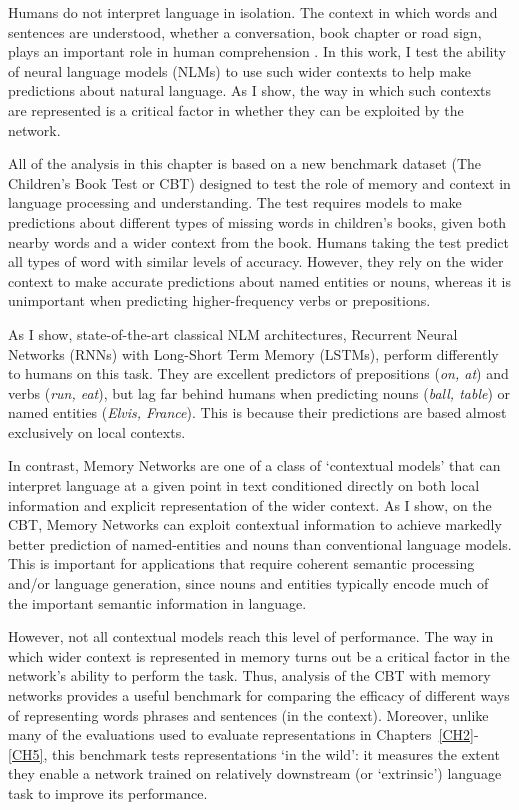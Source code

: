 Humans do not interpret language in isolation. The context in which words and sentences are understood, whether a conversation, book chapter or road sign, plays an important role in human comprehension \citep{altmann1988interaction,binder2011neurobiology}. In this work, I test the ability of neural language models (NLMs) to use such wider contexts to help make predictions about natural language. As I show, the way in which such contexts are represented is a critical factor in whether they can be exploited by the network.  

All of the analysis in this chapter is based on a new benchmark dataset (The Children's Book Test or CBT) designed to test the role of memory and context in language processing and understanding. The test requires models to make predictions about different types of missing words in children's books, given both nearby words and a wider context from the book. Humans taking the test predict all types of word with similar levels of accuracy. However, they rely on the wider context to make accurate predictions about named entities or nouns, whereas it is unimportant when predicting higher-frequency verbs or prepositions. 

As I show, state-of-the-art classical NLM architectures, Recurrent Neural Networks (RNNs) with Long-Short Term Memory (LSTMs), perform differently to humans on this task. They are excellent predictors of prepositions (\emph{on, at}) and verbs (\emph{run, eat}), but lag far behind humans when predicting nouns (\emph{ball, table}) or named entities (\emph{Elvis, France}). This is because their predictions are based almost exclusively on local contexts.  

In contrast, Memory Networks \citep{weston2014memory} are one of a class of `contextual models' that can interpret language at a given point in text conditioned directly on both local information and explicit representation of the wider context. As I show, on the CBT, Memory Networks can exploit contextual information to achieve markedly better prediction of named-entities and nouns than conventional language models. This is important for applications that require coherent semantic processing and/or language generation, since nouns and entities typically encode much of the important semantic information in language. 

However, not all contextual models reach this level of performance. The way in which wider context is represented in memory turns out be a critical factor in the network's ability to perform the task. Thus, analysis of the CBT with memory networks provides a useful benchmark for comparing the efficacy of different ways of representing words phrases and sentences (in the context). Moreover, unlike many of the evaluations used to evaluate representations in Chapters~\ref{CH2}-\ref{CH5}, this benchmark tests representations `in the wild': it measures the extent they enable a network trained on relatively downstream (or `extrinsic') language task to improve its performance. 

